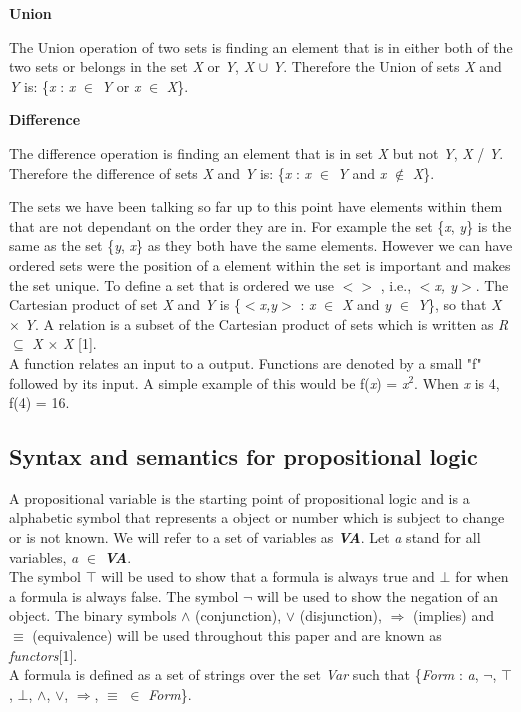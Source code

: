 \documentclass[11pt,a4paper]{article}
\begin{document}
\textbf{Union}

\indent The Union operation of two sets is finding an element that is in either both of the two sets or belongs in the set \textit{X} or \textit{Y}, \textit{X} $\cup$ \textit{Y}. Therefore the Union of sets \textit{X} and \textit{Y} is: \{\textit{x} : \textit{x} $\in$ \textit{Y} or \textit{x} $\in$ \textit{X}\}. \newline

\textbf{Difference}

\indent The difference operation is finding an element that is in set \textit{X} but not \textit{Y}, \textit{X} / \textit{Y}. Therefore the difference of sets \textit{X} and \textit{Y} is: \{\textit{x} : \textit{x} $\in$ \textit{Y} and \textit{x} $\not \in$ \textit{X}\}.

The sets we have been talking so far up to this point have elements within them that are not dependant on the order they are in. For example the set \{\textit{x}, \textit{y}\} is the same as the set \{\textit{y}, \textit{x}\} as they both have the same elements. However we can have ordered sets were the position of a element within the set is important and makes the set unique. To define a set that is ordered we use $<> $ , i.e., $<$\textit{x, y}$>$. \newline
The Cartesian product of set \textit{X} and \textit{Y} is \{$<$\textit{x,y}$>$ : \textit{x} $\in$ \textit{X} and \textit{y} $\in$ \textit{Y}\}, so that \textit{X} $\times$ \textit{Y}.\newline
A relation is a subset of the Cartesian product of sets which is written as \textit{R} $\subseteq$ \textit{X} $\times$ \textit{X} [1].\\

A function relates an input to a output. Functions are denoted by a small "f" followed by its input. A simple example of this would be f(\textit{x}) = \textit{x}$^2$. When \textit{x} is 4, f(4) = {16}.



\newpage
\subsection{Syntax and semantics for propositional logic}
A propositional variable is the starting point of propositional logic and is a alphabetic symbol that represents a object or number which is subject to change or is not known. We will refer to a set of variables as \textit{\textbf{VA}}. Let \textit{a} stand for all variables, \textit{a} $\in$ \textit{\textbf{VA}}.\\
The symbol $\top$ will be used to show that a formula is always true and $\bot$ for when a formula is always false. The symbol $\neg$ will be used to show the negation of an object. The binary symbols $\land$ (conjunction), $\lor$ (disjunction), $\Rightarrow$ (implies) and $\equiv$ (equivalence) will be used throughout this paper and are known as \textit{functors}[1].  \\
\noindent A formula is defined as a set of strings over the set \textit{Var} such that \{\textit{Form} : \textit{a}, $\neg$, $\top$, $\bot$, $\land$, $\lor$, $\Rightarrow$, $\equiv$ $\in$ \textit{Form}\}. \\
\end{document}
